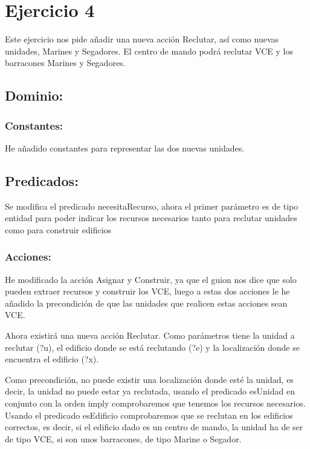 \documentclass[10pt, spanish]{article}
\begin{document}
\section{Ejercicio 4}

Este ejercicio nos pide añadir una nueva acción Reclutar, así como nuevas unidades, Marines y Segadores. El centro de mando podrá reclutar VCE y los barracones Marines y Segadores.

\subsection{Dominio:}

\subsubsection{Constantes:}

He añadido constantes para representar las dos nuevas unidades.

\subsection{Predicados:}

Se modifica el predicado necesitaRecurso, ahora el primer parámetro es de tipo entidad para poder indicar los recursos necesarios tanto para reclutar unidades como para construir edificios

\subsubsection{Acciones:}

He modificado la acción Asignar y Construir, ya que el guion nos dice que solo pueden extraer recursos y construir los VCE, luego a estas dos acciones le he añadido la precondición de que las unidades que realicen estas acciones sean VCE.


Ahora existirá una nueva acción Reclutar. Como parámetros tiene la unidad a reclutar (?u), el edificio donde se está reclutando (?e) y la localización donde se encuentra el edificio (?x).

Como precondición, no puede existir una localización donde esté la unidad, es decir, la unidad no puede estar ya reclutada, usando el predicado esUnidad en conjunto con la orden imply comprobaremos que tenemos los recursos necesarios. Usando el predicado esEdificio comprobaremos que se reclutan en los edificios correctos, es decir, si el edificio dado es un centro de mando, la unidad ha de ser de tipo VCE, si son unos barracones, de tipo Marine o Segador.
\end{document}
